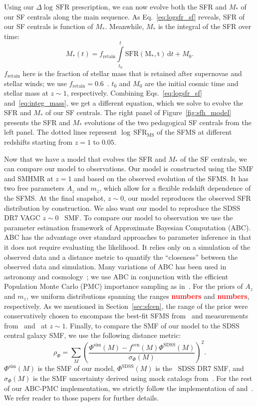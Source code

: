 \documentclass[12pt, letterpaper, preprint]{aastex}
\newcommand{\todo}[1]{{\bf \textcolor{red}{#1}}}
\newcommand{\beq}{\begin{equation}}
\newcommand{\eeq}{\end{equation}}
\newcommand{\logsfr}{\log \, \mathrm{SFR}}
\begin{document}
Using our $\Delta \logsfr$ prescription, we can now evolve both the 
SFR and $M_*$ of our SF centrals along the main sequence. As Eq.~\ref{eq:logsfr_sf}
reveals, SFR of our SF centrals is function of $M_*$. Meanwhile, $M_*$ is the
integral of the SFR over time: 
\beq \label{eq:integ_mass} 
M_*(t) = f_\mathrm{retain} \int\limits_{t_0}^{t} \mathrm{SFR(M_*, t)}\,\mathrm{d}t + M_0. 
\eeq
$f_\mathrm{retain}$ here is the fraction of stellar mass that is retained after 
supernovae and stellar winds; we use $f_\mathrm{retain} = 0.6$~\citep{wetzel2013}. 
$t_0$ and $M_0$ are the initial cosmic time and stellar mass at $z \sim 1$, respectively. 
Combining Eqs.~\ref{eq:logsfr_sf} and~\ref{eq:integ_mass}, we get a different 
equation, which we solve to evolve the SFR and $M_*$ of our SF centrals.  
The right panel of Figure~\ref{fig:sfh_model} presents the SFR and $M_*$ 
evolutions of the two pedagogical SF centrals from the left panel. The dotted 
lines represent $\log\,\overline{\mathrm{SFR}}_\mathrm{MS}$ of the SFMS at different 
redshifts starting from $z = 1$ to $0.05$. %

Now that we have a model that evolves the SFR and $M_*$ of the SF centrals, 
we can compare our model to observations. Our model is constructed using the 
SMF and SMHMR at $z = 1$ and based on the observed evolution of the SFMS. 
It has two free parameters $A_z$ and $m_z$, which allow for a flexible redshift 
dependence of the SFMS. At the final snapshot, $z \sim 0$, our model reproduces 
the observed SFR distribution by construction. We also want our model to reproduce 
the SDSS DR7 VAGC $z \sim 0$~\cite{li2009} SMF. To compare our model to observation
we use the parameter estimation framework of Approximate Bayesian Computation (ABC). 
ABC has the advantage over standard approaches to parameter inference in that it does not 
require evaluating the likelihood. It relies only on a simulation of the observed 
data and a distance metric to quantify the ``closeness'' between the observed data
and simulation. Many variations of ABC has been used in astronomy and 
cosmology~\citep[\emph{e.g.}][]{cameron2012,weyant2013,ishida2015,alsing2018}; 
we use ABC in conjunction with the efficient Population Monte Carlo (PMC)
importance sampling as in~\citep{hahn2016, hahn2017}. For the priors of $A_z$ and $m_z$, 
we uniform distributions spanning the ranges \todo{numbers} and \todo{numbers}, 
respectively. As we mentioned in Section~\ref{sec:sfcen}, the range of the prior 
were conservatively chosen to encompass the best-fit SFMS from~\cite{speagle2014} 
and measurements from~\cite{moustakas2013} and~\cite{lee2015} at $z \sim 1$. 
Finally, to compare the SMF of our model to the SDSS central galaxy SMF, we use the following
distance metric: 
\beq
\rho_\Phi = \sum\limits_{M} \left( \frac{\Phi^\mathrm{sim}(M) - f^\mathrm{cen}(M) \Phi^\mathrm{SDSS}(M)}{\sigma_\Phi(M)}\right)^2.
\eeq
$\Phi^\mathrm{sim}(M)$ is the SMF of our model, $\Phi^\mathrm{SDSS}(M)$ is 
the~\cite{li2009} SDSS DR7 SMF, and $\sigma_\Phi(M)$ is the SMF uncertainty 
derived using mock catalogs from~\cite{li2009}. For the rest of our ABC-PMC 
implementation, we strictly follow the implementation of \cite{hahn2017b} 
and~\cite{hahn2017a}. We refer reader to those papers for further details.
\end{document}
